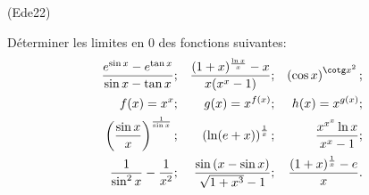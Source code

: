 \begin{tiny}(Ede22)\end{tiny} D{\'e}terminer les limites en $0$ des fonctions suivantes:
\begin{align*}
\frac{e^{\sin x}-e^{\tan x}}{\sin x-\tan x}; & &
\frac{(1+x)^{\frac{\ln x}{x}}-x}{x(x^{x}-1)};& & 
\left( \cos x\right) ^{\cotg x^{2}};\\
f(x) =x^{x};& & g(x)=x^{f(x)}; & & h(x)=x^{g(x)}; \\
\left( \frac{\sin x}{x}\right) ^{\frac{1}{\sin x}}; & &
\left( \ln (e+x)\right) ^{\frac{1}{x}}; & & 
\frac{x^{x^{x}}\ln x}{x^{x}-1};\\
\frac{1}{\sin^2 x} - \frac{1}{x^2}; & &
\frac{\sin\left( x - \sin x\right) }{\sqrt{1+x^3} - 1};& &
\frac{(1+x)^{\frac{1}{x}} - e}{x}.
\end{align*}